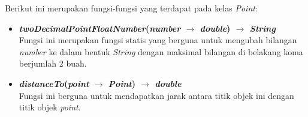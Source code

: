 Berikut ini merupakan fungsi-fungsi yang terdapat pada kelas \textit{Point}:
\begin{itemize}
	\item \textbf{\textit{twoDecimalPointFloatNumber}(\textit{number} \(\rightarrow\) \textit{double}) \(\rightarrow\) \textit{String}}\\
	Fungsi ini merupakan fungsi statis yang berguna untuk mengubah bilangan \textit{number} ke dalam bentuk \textit{String} dengan maksimal bilangan di belakang koma berjumlah 2 buah.
	\item \textbf{\textit{distanceTo}(\textit{point} \(\rightarrow\) \textit{Point}) \(\rightarrow\) \textit{double}}\\
	Fungsi ini berguna untuk mendapatkan jarak antara titik objek ini dengan titik objek \textit{point}.
\end{itemize}



























